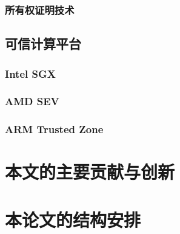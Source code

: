 \subsubsection{所有权证明技术}
\subsection{可信计算平台}
\subsubsection{Intel SGX}
\subsubsection{AMD SEV}
\subsubsection{ARM Trusted Zone}


\section{本文的主要贡献与创新}

\section{本论文的结构安排}